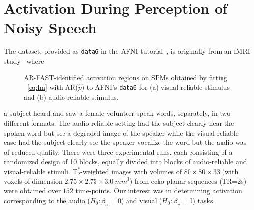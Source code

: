 \section{Activation During Perception of Noisy Speech}\label{sec:Apps}
The dataset, provided as  {\tt data6} in the AFNI tutorial~\citet{cox96},
is originally from an fMRI study~\citet{nathandbeauchamp11} where
\begin{figure}[h]
\caption{ AR-FAST-identified activation regions on SPMs obtained by
  fitting ~\ref{eq:lm} with   AR($\hat{p}$) to AFNI's {\tt data6} for
  (a) visual-reliable stimulus and (b) audio-reliable
  stimulus.}
\label{fig:AMSmoothingAFNI}
\end{figure}
\begin{comment}
\begin{figure*}[h]
\subfloat[]{\texttt{[image: figures/Visual\_AM-crop]}}
\subfloat[]{\texttt{[image: figures/Audio\_AM-crop]}}
\subfloat[]{\texttt{[image: figures/Visual\_Audio\_AM-crop]}}
\caption{Activation areas obtained using AR-FAST with in {\it AFNI data6} on the SPM obtained
  after fitting AR($\hat{p}$) of the (a) Visual-reliable, (b) Audio-reliable and (c) the difference contrast between Visual-reliable and Audio-reliable.}
\label{fig:AMSmoothingAFNI}
\end{figure*}
\end{comment}
a subject heard and saw a female volunteer speak words, separately, in
two different formats. The audio-reliable setting had the subject
clearly hear the spoken word but see a degraded image of the speaker
while the visual-reliable case had the subject clearly see the speaker
vocalize the word but the audio was of reduced quality.  There were
three experimental runs, each 
consisting of a randomized design of 10 blocks, equally divided into blocks of
audio-reliable and visual-reliable stimuli. %
$\mbox{T}_2^*$-weighted images with volumes of $80 \times 80 \times
33$ (with voxels of dimension $2.75 \times  2.75 \times 3.0\  mm^3$)
from  echo-planar sequences (TR=2s) 
were obtained  over $152$ time-points. Our interest was in determining 
activation corresponding to the audio
($H_0:\beta_{a}=0$) and visual
($H_0:\beta_{v}=0$) tasks.
